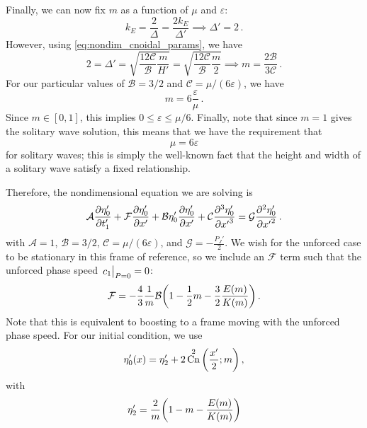 \documentclass{jfm}
\DeclareMathOperator{\cn}{Cn}
\renewcommand*{\epsilon}{\varepsilon}
\begin{document}
Finally, we can now fix $m$ as a function of $\mu$ and $\epsilon$:
\begin{equation}
  k_E = \frac{2}{\Delta} = \frac{2 k_E}{\Delta'}
  \implies \Delta' = 2 \,.
\end{equation}
However, using \cref{eq:nondim_cnoidal_params}, we have
\begin{equation}
  2 = \Delta ' = \sqrt{\frac{12 \mathcal{C}}{\mathcal{B}}
    \frac{m}{H'}}
  = \sqrt{\frac{12 \mathcal{C}}{\mathcal{B}} \frac{m}{2}}
  \implies m = \frac{2 \mathcal{B}}{3 \mathcal{C}} \,.
\end{equation}
For our particular values of $\mathcal{B} = 3/2$ and $\mathcal{C} =
\mu/(6 \epsilon)$, we have
\begin{equation}
  m = 6 \frac{\epsilon}{\mu} \,.
\end{equation}
Since $m \in [0,1]$, this implies $0 \le \epsilon \le \mu/6$.
Finally, note that since $m = 1$ gives the solitary wave solution, this
means that we have the requirement that
\begin{equation}
  \mu = 6 \epsilon
\end{equation}
for solitary waves; this is simply the well-known fact that the height
and width of a solitary wave satisfy a fixed relationship.

Therefore, the nondimensional equation we are solving is
\begin{equation}
  \mathcal{A} \pdv{\eta'_0}{t'_1} + \mathcal{F} \pdv{\eta'_0}{x'} + \mathcal{B}
  \eta'_0 \pdv{\eta'_0}{x'} + \mathcal{C} \pdv[3]{\eta'_0}{{x'}} =
  \mathcal{G} \pdv[2]{\eta'_0}{{x'}} \,.
  \label{eq:kdvb_nondim}
\end{equation}
with $\mathcal{A} = 1$, $\mathcal{B} = 3/2$, $\mathcal{C} =
\mu/(6\epsilon)$, and $\mathcal{G} = -\frac{P_J'}{2}$.
We wish for the unforced case to be stationary in this frame of
reference, so we include an $\mathcal{F}$ term such that the unforced
phase speed $\eval{c_1}_{P=0} = 0$:
\begin{equation}
  \mathcal{F} = -\frac{4}{3} \frac{1}{m} \mathcal{B}
    \pqty{1 - \frac{1}{2} m - \frac{3}{2} \frac{E(m)}{K(m)}} \,.
\end{equation}
Note that this is equivalent to boosting to a frame moving with the
unforced phase speed.
For our initial condition, we use
\begin{equation}
  \eta'_0(x) = \eta'_2 + 2 \cn^2\pqty{\frac{x'}{2}; m} \,,
  \label{eq:initial_cond_nondim}
\end{equation}
with
\begin{equation}
  \eta'_2 = \frac{2}{m} \pqty{1 - m - \frac{E(m)}{K(m)}}
\end{equation}
\end{document}
